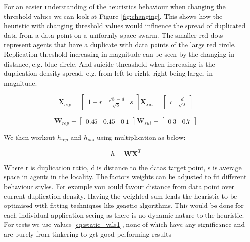 \documentclass{UoYCSproject}
\begin{document}
For an easier understanding of the heuristics behaviour when changing the threshold values we can look at Figure \ref{fig:changing}. 
This shows how the heuristic with changing threshold values would influence the spread of duplicated data from a data point on a uniformly space swarm. 
The smaller red dots represent agents that have a duplicate with data points of the large red circle. 
Replication threshold increasing in magnitude can be seen by the changing in distance, e.g. blue circle. 
And suicide threashold when increasing is the duplication density spread, e.g. from left to right, right being larger in magnitude.

\begin{equation}
\label{eq:static_vals2}
\textbf{X}_{rep}  = \begin{bmatrix}1-r &  \frac{\sqrt{8}-d}{\sqrt{8}} & s \end{bmatrix}
\textbf{X}_{sui}  =  \begin{bmatrix} r & \frac{d}{\sqrt{8}}\end{bmatrix} 
\end{equation}

\begin{equation}
\label{eq:static_vals1}
\textbf{W}_{rep}  = \begin{bmatrix}0.45 & 0.45 & 0.1\end{bmatrix}
\textbf{W}_{sui}  =  \begin{bmatrix}0.3 & 0.7 \end{bmatrix} 
\end{equation}

We then workout $h_{rep}$ and $h_{sui}$ using multiplication as below:

\begin{equation}
\label{eq:10}
h = \textbf{W} \textbf{X} ^{T}
\end{equation}

Where r is duplication ratio, d is distance to the datas target point, s is average space in agents in the locality.
The factors weights can be adjusted to fit different behaviour styles. 
For example you could favour distance from data point over current duplication density. 
Having the weighted sum lends the heuristic to be optimised with fitting techniques like genetic algorithms. 
This would be done for each individual application seeing as there is no dynamic nature to the heuristic.
For tests we use values \ref{eq:static_vals1},  none of which have any significance and are purely from tinkering to get good performing results.
\end{document}
